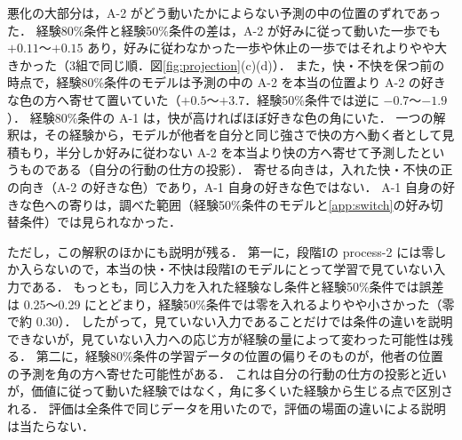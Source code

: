悪化の大部分は，A-2 がどう動いたかによらない予測の中の位置のずれであった．
経験80\%条件と経験50\%条件の差は，A-2 が好みに従って動いた一歩でも $+0.11$〜$+0.15$ あり，好みに従わなかった一歩や休止の一歩ではそれよりやや大きかった（3組で同じ順．図\ref{fig:projection}(c)(d)）．
また，快・不快を保つ前の時点で，経験80\%条件のモデルは予測の中の A-2 を本当の位置より A-2 の好きな色の方へ寄せて置いていた（$+0.5$〜$+3.7$．経験50\%条件では逆に $-0.7$〜$-1.9$）．
経験80\%条件の A-1 は，快が高ければほぼ好きな色の角にいた．
一つの解釈は，その経験から，モデルが他者を自分と同じ強さで快の方へ動く者として見積もり，半分しか好みに従わない A-2 を本当より快の方へ寄せて予測したというものである（自分の行動の仕方の投影）．
寄せる向きは，入れた快・不快の正の向き（A-2 の好きな色）であり，A-1 自身の好きな色ではない．
A-1 自身の好きな色への寄りは，調べた範囲（経験50\%条件のモデルと\ref{app:switch}の好み切替条件）では見られなかった．

ただし，この解釈のほかにも説明が残る．
第一に，段階Iの process-2 には零しか入らないので，本当の快・不快は段階Iのモデルにとって学習で見ていない入力である．
もっとも，同じ入力を入れた経験なし条件と経験50\%条件では誤差は 0.25〜0.29 にとどまり，経験50\%条件では零を入れるよりやや小さかった（零で約 0.30）．
したがって，見ていない入力であることだけでは条件の違いを説明できないが，見ていない入力への応じ方が経験の量によって変わった可能性は残る．
第二に，経験80\%条件の学習データの位置の偏りそのものが，他者の位置の予測を角の方へ寄せた可能性がある．
これは自分の行動の仕方の投影と近いが，価値に従って動いた経験ではなく，角に多くいた経験から生じる点で区別される．
評価は全条件で同じデータを用いたので，評価の場面の違いによる説明は当たらない．

